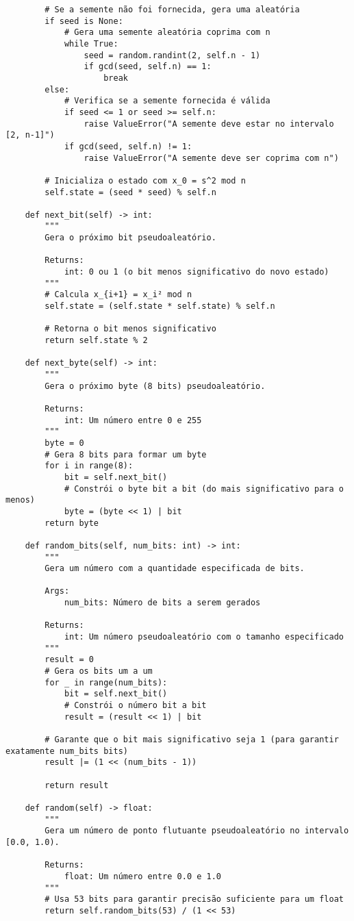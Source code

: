 \begin{verbatim}
        # Se a semente não foi fornecida, gera uma aleatória
        if seed is None:
            # Gera uma semente aleatória coprima com n
            while True:
                seed = random.randint(2, self.n - 1)
                if gcd(seed, self.n) == 1:
                    break
        else:
            # Verifica se a semente fornecida é válida
            if seed <= 1 or seed >= self.n:
                raise ValueError("A semente deve estar no intervalo [2, n-1]")
            if gcd(seed, self.n) != 1:
                raise ValueError("A semente deve ser coprima com n")
        
        # Inicializa o estado com x_0 = s^2 mod n
        self.state = (seed * seed) % self.n
    
    def next_bit(self) -> int:
        """
        Gera o próximo bit pseudoaleatório.
        
        Returns:
            int: 0 ou 1 (o bit menos significativo do novo estado)
        """
        # Calcula x_{i+1} = x_i² mod n
        self.state = (self.state * self.state) % self.n
        
        # Retorna o bit menos significativo
        return self.state % 2
    
    def next_byte(self) -> int:
        """
        Gera o próximo byte (8 bits) pseudoaleatório.
        
        Returns:
            int: Um número entre 0 e 255
        """
        byte = 0
        # Gera 8 bits para formar um byte
        for i in range(8):
            bit = self.next_bit()
            # Constrói o byte bit a bit (do mais significativo para o menos)
            byte = (byte << 1) | bit
        return byte
    
    def random_bits(self, num_bits: int) -> int:
        """
        Gera um número com a quantidade especificada de bits.
        
        Args:
            num_bits: Número de bits a serem gerados
            
        Returns:
            int: Um número pseudoaleatório com o tamanho especificado
        """
        result = 0
        # Gera os bits um a um
        for _ in range(num_bits):
            bit = self.next_bit()
            # Constrói o número bit a bit
            result = (result << 1) | bit
        
        # Garante que o bit mais significativo seja 1 (para garantir exatamente num_bits bits)
        result |= (1 << (num_bits - 1))
        
        return result
    
    def random(self) -> float:
        """
        Gera um número de ponto flutuante pseudoaleatório no intervalo [0.0, 1.0).
        
        Returns:
            float: Um número entre 0.0 e 1.0
        """
        # Usa 53 bits para garantir precisão suficiente para um float
        return self.random_bits(53) / (1 << 53)
\end{verbatim}

